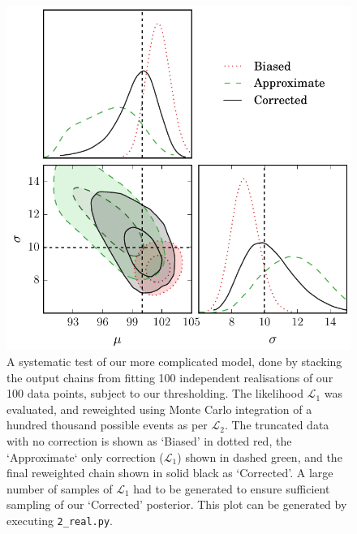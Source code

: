 \documentclass[a4paper,fleqn,usenatbib]{mnras}
\newcommand{\green}{\color{ForestGreen}}
\begin{document}
\begin{figure}
	\begin{center}
		\includegraphics[width=\columnwidth]{fig_2_real.pdf}
	\end{center}
	\caption{A systematic test of our more complicated model, done by stacking the output chains from fitting 100 independent realisations of our 100 data points, subject to our thresholding. The likelihood $\mathcal{L}_1$ was evaluated, and reweighted using Monte Carlo integration of a hundred thousand possible events as per $\mathcal{L}_2$. The truncated data with no correction is shown as `Biased' in dotted red, the `Approximate` only correction ($\mathcal{L}_1$) shown in dashed green, and the final reweighted chain shown in solid black as `Corrected'. A large number of samples of $\mathcal{L}_1$ had to be generated to ensure sufficient sampling of our `Corrected' posterior. {\green This plot can be generated by executing \mbox{\texttt{2\_real.py}}.}}
	\label{fig:real}
\end{figure}
\end{document}
